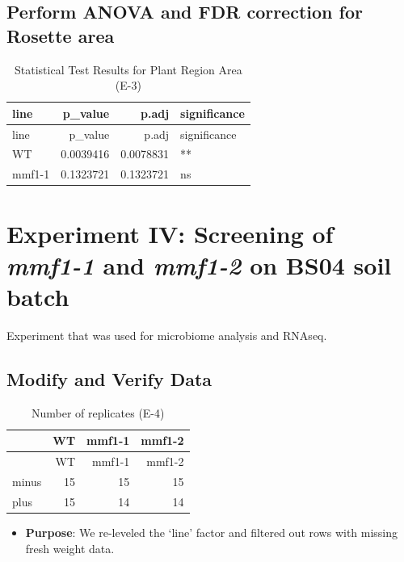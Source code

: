 \documentclass[
  10pt,
]{article}
\providecommand{\tightlist}{%
  \setlength{\itemsep}{0pt}\setlength{\parskip}{0pt}}\usepackage{longtable,booktabs,array}
\begin{document}
\subsection{\texorpdfstring{\textbf{Perform ANOVA and FDR correction for
Rosette
area}}{Perform ANOVA and FDR correction for Rosette area}}\label{perform-anova-and-fdr-correction-for-rosette-area}

\begin{longtable}[]{@{}lrrl@{}}
\caption{Statistical Test Results for Plant Region Area
(E-3)}\tabularnewline
\toprule\noalign{}
line & p\_value & p.adj & significance \\
\midrule\noalign{}
\endfirsthead
\toprule\noalign{}
line & p\_value & p.adj & significance \\
\midrule\noalign{}
\endhead
\bottomrule\noalign{}
\endlastfoot
WT & 0.0039416 & 0.0078831 & ** \\
mmf1-1 & 0.1323721 & 0.1323721 & ns \\
\end{longtable}

\section{\texorpdfstring{Experiment IV: Screening of \emph{mmf1-1} and
\emph{mmf1-2} on BS04 soil
batch}{Experiment IV: Screening of mmf1-1 and mmf1-2 on BS04 soil batch}}\label{experiment-iv-screening-of-mmf1-1-and-mmf1-2-on-bs04-soil-batch}

Experiment that was used for microbiome analysis and RNAseq.

\subsection{Modify and Verify Data}\label{modify-and-verify-data-1}

\begin{longtable}[]{@{}lrrr@{}}
\caption{Number of replicates (E-4)}\tabularnewline
\toprule\noalign{}
& WT & mmf1-1 & mmf1-2 \\
\midrule\noalign{}
\endfirsthead
\toprule\noalign{}
& WT & mmf1-1 & mmf1-2 \\
\midrule\noalign{}
\endhead
\bottomrule\noalign{}
\endlastfoot
minus & 15 & 15 & 15 \\
plus & 15 & 14 & 14 \\
\end{longtable}

\begin{itemize}
\tightlist
\item
  \textbf{Purpose}: We re-leveled the `line' factor and filtered out
  rows with missing fresh weight data.
\end{itemize}
\end{document}
